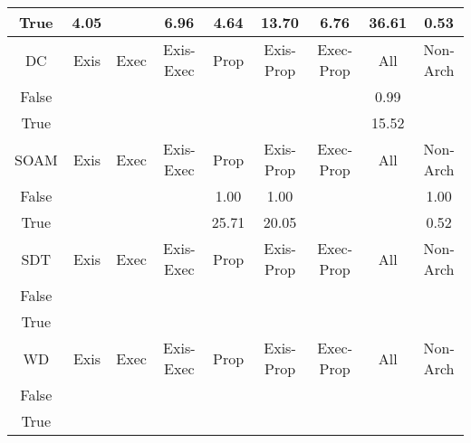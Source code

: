 \begin{tabular}{|c||c|c|c|c|c|c|c|c|}
\hline
True & \cellcolor[rgb]{0.8774574089610336,0.8245850884552264,0.42} 4.05 &  & \cellcolor[rgb]{0.8463788605026086,0.8098636707643935,0.42} 6.96 & \cellcolor[rgb]{0.8711722744937906,0.8216079194970587,0.42} 4.64 & \cellcolor[rgb]{0.7744485016903022,0.7757913955375115,0.42} 13.70 & \cellcolor[rgb]{0.848578181228108,0.8109054542659458,0.42} 6.76 & \cellcolor[rgb]{0.53,0.66,0.42} 36.61 & \cellcolor[rgb]{0.763560123329511,0.14685125042635222,0.2833227817742103} 0.53 \\ 
\hline
\hline
DC & Exis & Exec & Exis-Exec & Prop & Exis-Prop & Exec-Prop & All & Non-Arch \\ 
\hline
False &  &  &  &  &  &  & \cellcolor[rgb]{0.9082653883508676,0.8317895048607731,0.4183810291274764} 0.99 &  \\ 
\hline
True &  &  &  &  &  &  & \cellcolor[rgb]{0.7551077884652626,0.7666300050624928,0.42} 15.52 &  \\ 
\hline
\hline
SOAM & Exis & Exec & Exis-Exec & Prop & Exis-Prop & Exec-Prop & All & Non-Arch \\ 
\hline
False &  &  &  & \cellcolor[rgb]{0.9092597317226335,0.8364960634871319,0.41930908294112457} 1.00 & \cellcolor[rgb]{0.9094293307446505,0.8372988321913455,0.4194673753616738} 1.00 &  &  & \cellcolor[rgb]{0.9099995082503411,0.839999767065951,0.42} 1.00 \\ 
\hline
True &  &  &  & \cellcolor[rgb]{0.646361054803286,0.715118394380504,0.42} 25.71 & \cellcolor[rgb]{0.7067620048885888,0.7437293707366999,0.42} 20.05 &  &  & \cellcolor[rgb]{0.76,0.13,0.28} 0.52 \\ 
\hline
\hline
SDT & Exis & Exec & Exis-Exec & Prop & Exis-Prop & Exec-Prop & All & Non-Arch \\ 
\hline
False &  &  &  &  &  &  &  &  \\ 
\hline
True &  &  &  &  &  &  &  &  \\ 
\hline
\hline
WD & Exis & Exec & Exis-Exec & Prop & Exis-Prop & Exec-Prop & All & Non-Arch \\ 
\hline
False &  &  &  &  &  &  &  &  \\ 
\hline
True &  &  &  &  &  &  &  &  \\ 
\hline
\end{tabular}